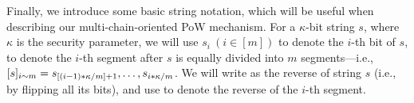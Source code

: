 \medskip
%
Finally, we introduce some basic string notation, which will be useful when describing our multi-chain-oriented PoW mechanism.
%
For a $\kappa$-bit string $s$, where $\kappa$ is the security parameter, we will use $s_i~(i \in [m])$ to denote the $i$-th bit of $s$,  to denote the $i$-th segment after $s$ is equally divided into $m$ segments---i.e., $[s]_{i\sim m} = s_{[(i - 1) * \kappa / m ]+ 1}, \ldots, s_{i * \kappa / m}$.
%
We will write  as the reverse of string $s$ (i.e., by flipping all its bits), and use  to denote the reverse of the $i$-th segment.

